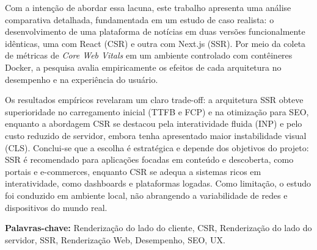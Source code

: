 \begin{resumo}
Com a intenção de abordar essa lacuna, este trabalho apresenta uma análise comparativa detalhada, fundamentada em um estudo de caso realista: o desenvolvimento de uma plataforma de notícias em duas versões funcionalmente idênticas, uma com React (CSR) e outra com Next.js (SSR). Por meio da coleta de métricas de \textit{Core Web Vitals} em um ambiente controlado com contêineres Docker, a pesquisa avalia empiricamente os efeitos de cada arquitetura no desempenho e na experiência do usuário.

Os resultados empíricos revelaram um claro trade-off: a arquitetura SSR obteve superioridade no carregamento inicial (TTFB e FCP) e na otimização para SEO, enquanto a abordagem CSR se destacou pela interatividade fluida (INP) e pelo custo reduzido de servidor, embora tenha apresentado maior instabilidade visual (CLS). Conclui-se que a escolha é estratégica e depende dos objetivos do projeto: SSR é recomendado para aplicações focadas em conteúdo e descoberta, como portais e e-commerces, enquanto CSR se adequa a sistemas ricos em interatividade, como dashboards e plataformas logadas. Como limitação, o estudo foi conduzido em ambiente local, não abrangendo a variabilidade de redes e dispositivos do mundo real.

\textbf{Palavras-chave:} Renderização do lado do cliente, CSR, Renderização do lado do servidor, SSR, Renderização Web, Desempenho, SEO, UX.
\end{resumo}